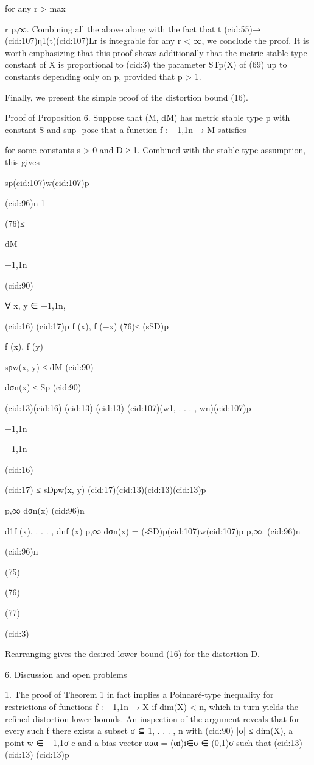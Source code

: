 for any r > max{r
p,∞. Combining all the above along with the fact
that t (cid:55)→ (cid:107)η1(t)(cid:107)Lr is integrable for any r < ∞, we conclude the proof. It is worth emphasizing
that this proof shows additionally that the metric stable type constant of X is proportional to
(cid:3)
the parameter STp(X) of (69) up to constants depending only on p, provided that p > 1.

Finally, we present the simple proof of the distortion bound (16).

Proof of Proposition 6. Suppose that (M, dM) has metric stable type p with constant S and sup-
pose that a function f : {−1,1}n → M satisﬁes

for some constants s > 0 and D ≥ 1. Combined with the stable type assumption, this gives

sp(cid:107)w(cid:107)p

(cid:96)n
1

(76)≤

dM

{−1,1}n

(cid:90)

∀ x, y ∈ {−1,1}n,

(cid:16)
(cid:17)p
f (x), f (−x)
(76)≤ (sSD)p

f (x), f (y)

sρw(x, y) ≤ dM
(cid:90)

dσn(x) ≤ Sp
(cid:90)

(cid:13)(cid:16)
(cid:13)
(cid:13)
(cid:107)(w1, . . . , wn)(cid:107)p

{−1,1}n

{−1,1}n

(cid:16)

(cid:17) ≤ sDρw(x, y)
(cid:17)(cid:13)(cid:13)(cid:13)p

p,∞ dσn(x)
(cid:96)n

d1f (x), . . . , dnf (x)
p,∞ dσn(x) = (sSD)p(cid:107)w(cid:107)p
p,∞.
(cid:96)n

(cid:96)n

(75)

(76)

(77)

(cid:3)

Rearranging gives the desired lower bound (16) for the distortion D.

6. Discussion and open problems

1. The proof of Theorem 1 in fact implies a Poincaré-type inequality for restrictions of functions
f : {−1,1}n → X if dim(X) < n, which in turn yields the reﬁned distortion lower bounds. An
inspection of the argument reveals that for every such f there exists a subset σ ⊆ {1, . . . , n} with
(cid:90)
|σ| ≤ dim(X), a point w ∈ {−1,1}σ c and a bias vector ααα = (αi)i∈σ ∈ (0,1)σ such that
(cid:13)
(cid:13)
(cid:13)p

}
